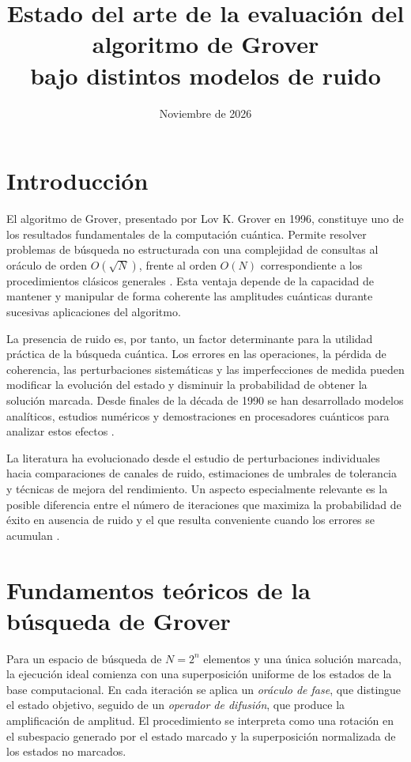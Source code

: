 \documentclass[11pt,a4paper]{article}
\title{Estado del arte de la evaluación del algoritmo de Grover\\bajo distintos modelos de ruido}
\author{}
\date{Noviembre de 2026}
\begin{document}
\maketitle

\section{Introducción}

El algoritmo de Grover, presentado por Lov K. Grover en 1996, constituye uno de los resultados fundamentales de la computación cuántica. Permite resolver problemas de búsqueda no estructurada con una complejidad de consultas al oráculo de orden $O(\sqrt{N})$, frente al orden $O(N)$ correspondiente a los procedimientos clásicos generales \cite{grover1996}. Esta ventaja depende de la capacidad de mantener y manipular de forma coherente las amplitudes cuánticas durante sucesivas aplicaciones del algoritmo.

La presencia de ruido es, por tanto, un factor determinante para la utilidad práctica de la búsqueda cuántica. Los errores en las operaciones, la pérdida de coherencia, las perturbaciones sistemáticas y las imperfecciones de medida pueden modificar la evolución del estado y disminuir la probabilidad de obtener la solución marcada. Desde finales de la década de 1990 se han desarrollado modelos analíticos, estudios numéricos y demostraciones en procesadores cuánticos para analizar estos efectos \cite{pablonorman1999,salas2008,cohn2016,pokharel2024}.

La literatura ha evolucionado desde el estudio de perturbaciones individuales hacia comparaciones de canales de ruido, estimaciones de umbrales de tolerancia y técnicas de mejora del rendimiento. Un aspecto especialmente relevante es la posible diferencia entre el número de iteraciones que maximiza la probabilidad de éxito en ausencia de ruido y el que resulta conveniente cuando los errores se acumulan \cite{cohn2016,leng2025}.

\section{Fundamentos teóricos de la búsqueda de Grover}

Para un espacio de búsqueda de $N=2^n$ elementos y una única solución marcada, la ejecución ideal comienza con una superposición uniforme de los estados de la base computacional. En cada iteración se aplica un \emph{oráculo de fase}, que distingue el estado objetivo, seguido de un \emph{operador de difusión}, que produce la amplificación de amplitud. El procedimiento se interpreta como una rotación en el subespacio generado por el estado marcado y la superposición normalizada de los estados no marcados.
\end{document}
